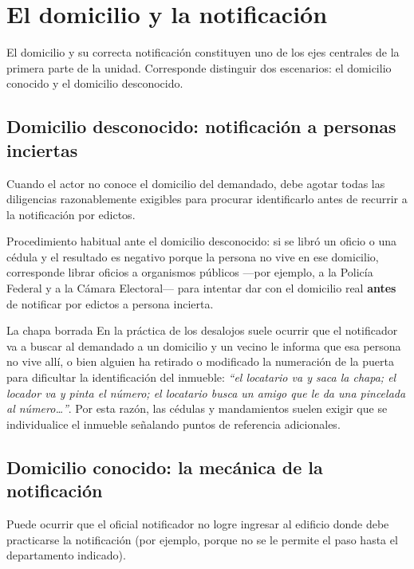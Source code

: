 \documentclass[12pt,oneside]{book}
\begin{document}
\section{El domicilio y la notificación}

El domicilio y su correcta notificación constituyen uno de los ejes centrales de la primera parte de la unidad. Corresponde distinguir dos escenarios: el domicilio conocido y el domicilio desconocido.

\subsection{Domicilio desconocido: notificación a personas inciertas}

Cuando el actor no conoce el domicilio del demandado, debe agotar todas las diligencias razonablemente exigibles para procurar identificarlo antes de recurrir a la notificación por edictos.

\begin{important}
Procedimiento habitual ante el domicilio desconocido: si se libró un oficio o una cédula y el resultado es negativo porque la persona no vive en ese domicilio, corresponde librar oficios a organismos públicos —por ejemplo, a la Policía Federal y a la Cámara Electoral— para intentar dar con el domicilio real \textbf{antes} de notificar por edictos a persona incierta.
\end{important}

\begin{example}{La chapa borrada}
En la práctica de los desalojos suele ocurrir que el notificador va a buscar al demandado a un domicilio y un vecino le informa que esa persona no vive allí, o bien alguien ha retirado o modificado la numeración de la puerta para dificultar la identificación del inmueble: \textit{``el locatario va y saca la chapa; el locador va y pinta el número; el locatario busca un amigo que le da una pincelada al número\dots''}. Por esta razón, las cédulas y mandamientos suelen exigir que se individualice el inmueble señalando puntos de referencia adicionales.
\end{example}

\subsection{Domicilio conocido: la mecánica de la notificación}

Puede ocurrir que el oficial notificador no logre ingresar al edificio donde debe practicarse la notificación (por ejemplo, porque no se le permite el paso hasta el departamento indicado).
\end{document}
